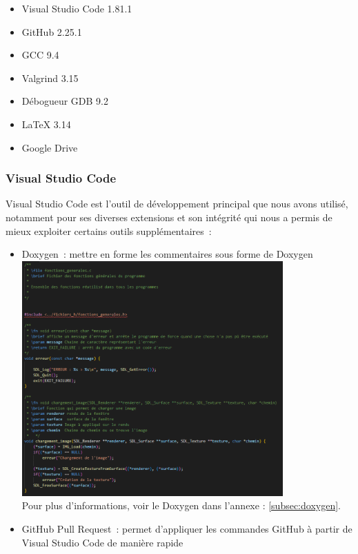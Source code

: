 \documentclass[12pt,a4paper]{article}
\begin{document}
            \begin{itemize}
                \item Visual Studio Code 1.81.1
                \item GitHub 2.25.1
                \item GCC  9.4
                \item Valgrind 3.15
                \item Débogueur GDB 9.2
                \item LaTeX 3.14
                \item Google Drive
            \end{itemize}

             \subsubsection{Visual Studio Code}
                \tabto{1cm} Visual Studio Code est l’outil de développement principal que nous avons utilisé, notamment pour ses diverses extensions et son intégrité qui nous a permis de mieux exploiter certains outils supplémentaires~:\\

                \newpage
                
                \begin{itemize}
                    \item Doxygen~: mettre en forme les commentaires sous forme de Doxygen\\

                    \includegraphics[width=10cm]{images/doxygen.png}\\

                    Pour plus d'informations, voir le Doxygen dans l'annexe : \ref{subsec:doxygen}.\\
                    
                    \item GitHub Pull Request~: permet d’appliquer les commandes GitHub à partir de Visual Studio Code de manière rapide
                \end{itemize}
                
\end{document}
